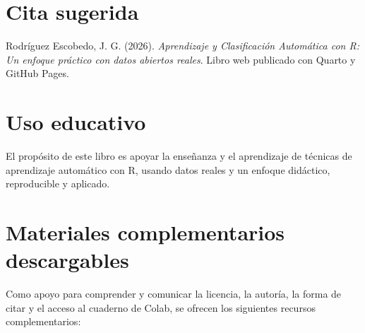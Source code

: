 \documentclass[
  spanish,
  10.5pt,
  letterpaper,
  openany,
  headings=big]{scrbook}
\begin{document}
\section*{Cita sugerida}\label{cita-sugerida}


Rodríguez Escobedo, J. G. (2026). \emph{Aprendizaje y Clasificación
Automática con R: Un enfoque práctico con datos abiertos reales}. Libro
web publicado con Quarto y GitHub Pages.

\section*{Uso educativo}\label{uso-educativo}


El propósito de este libro es apoyar la enseñanza y el aprendizaje de
técnicas de aprendizaje automático con R, usando datos reales y un
enfoque didáctico, reproducible y aplicado.

\section*{Materiales complementarios
descargables}\label{materiales-complementarios-descargables-1}


Como apoyo para comprender y comunicar la licencia, la autoría, la forma
de citar y el acceso al cuaderno de Colab, se ofrecen los siguientes
recursos complementarios:
\end{document}

